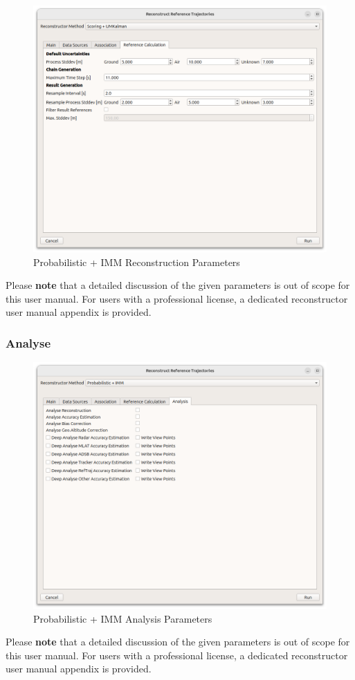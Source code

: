 \begin{figure}[H]
    \center
      \includegraphics[width=16cm]{figures/dialog_ref_calc.png}
    \caption{Probabilistic + IMM Reconstruction Parameters}
\end{figure}

Please \textbf{note} that a detailed discussion of the given parameters is out of scope for this user manual. For users with a professional license, a dedicated reconstructor user manual appendix is provided.

\subsubsection{Analyse}

\begin{figure}[H]
    \center
      \includegraphics[width=16cm]{figures/dialog_probimm_analyse.png}
    \caption{Probabilistic + IMM Analysis Parameters}
\end{figure}

Please \textbf{note} that a detailed discussion of the given parameters is out of scope for this user manual. For users with a professional license, a dedicated reconstructor user manual appendix is provided.
